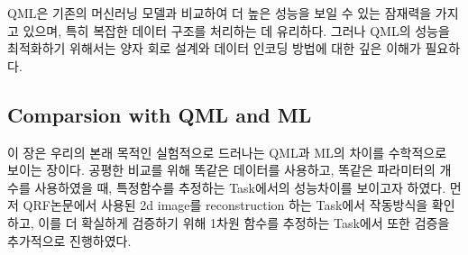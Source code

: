 QML은 기존의 머신러닝 모델과 비교하여 더 높은 성능을 보일 수 있는 잠재력을 가지고 있으며, 특히 복잡한 데이터 구조를 처리하는 데 유리하다. 그러나 QML의 성능을 최적화하기 위해서는 양자 회로 설계와 데이터 인코딩 방법에 대한 깊은 이해가 필요하다.

\subsection{Comparsion with QML and ML}

이 장은 우리의 본래 목적인 실험적으로 드러나는 QML과 ML의 차이를 수학적으로 보이는 장이다. 공평한 비교를 위해 똑같은 데이터를 사용하고, 똑같은 파라미터의 개수를 사용하였을 때, 특정함수를 추정하는 Task에서의 성능차이를 보이고자 하였다. 먼저 QRF논문에서 사용된 2d image를 reconstruction 하는 Task에서 작동방식을 확인하고, 이를 더 확실하게 검증하기 위해 1차원 함수를 추정하는 Task에서 또한 검증을 추가적으로 진행하였다.
